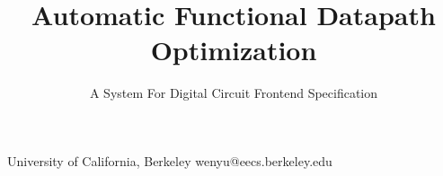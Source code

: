 \documentclass[10pt,nocopyrightspace]{sigplanconf}
\begin{document}
\preprintfooter{}   %

\title{Automatic Functional Datapath Optimization}
\subtitle{A System For Digital Circuit Frontend Specification}

           {University of California, Berkeley}
           {wenyu@eecs.berkeley.edu}

\maketitle


\tableofcontents
\setcounter{tocdepth}{2}










\clearpage

\setlength{\bibsep}{0.0pt}
\renewcommand*{\bibfont}{\footnotesize}

\end{document}
